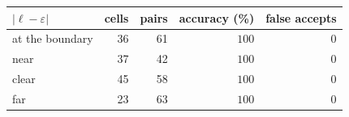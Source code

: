 \begin{tabular}{lrrrr}
\toprule
$|\ell-\varepsilon|$ & cells & pairs & accuracy (\%) & false accepts \\
\midrule
at the boundary & 36 & 61 & $100$ & 0 \\
near & 37 & 42 & $100$ & 0 \\
clear & 45 & 58 & $100$ & 0 \\
far & 23 & 63 & $100$ & 0 \\
\bottomrule
\end{tabular}

